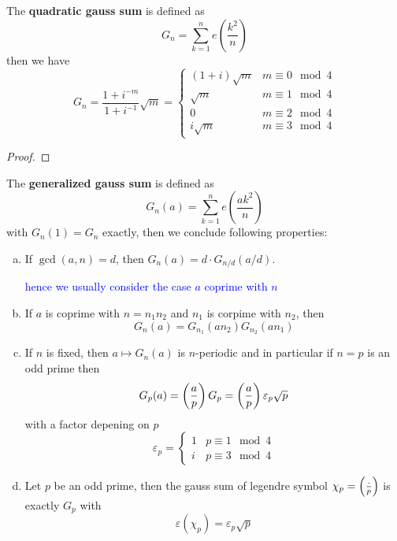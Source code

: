 \begin{lemma}
    The \textbf{ quadratic gauss sum} is defined as 
    \[G_n = \sum_{k=1}^n e(\frac{k^2}{n})\]
    then we have
    \[G_n = \frac{1+i^{-m}}{1+i^{-1}}\sqrt{m} = \begin{cases}
        (1+i)\sqrt{m} & m \equiv 0 \mod 4 \\
        \sqrt{m} & m \equiv 1 \mod 4 \\
        0 & m \equiv 2 \mod 4 \\
        i\sqrt{m} & m \equiv 3 \mod 4
    \end{cases}\]
\end{lemma}

\begin{proof}
    
\end{proof}

\begin{lemma}
    The \textbf{generalized gauss sum} is defined as 
    \[G_n(a) = \sum_{k=1}^n e(\frac{ak^2}{n})\]
    with \(G_n(1) = G_n\) exactly, then we conclude following properties:
    \begin{enumerate}[(a)]
        \item If \(\gcd(a,n) = d\), then \(G_n(a) = d \cdot G_{n/d}(a/d)\).
        \begin{center}
            \textcolor{blue}{hence we usually consider the case \(a\) coprime with \(n\)}
        \end{center}

        \item If \(a\) is coprime with \(n = n_1n_2\) and \(n_1\) is corpime with \(n_2\), then 
        \[G_n(a) = G_{n_1}(an_2) G_{n_2}(an_1)\] 

        \item If \(n\) is fixed, then \(a \mapsto G_n(a)\) is \(n\)-periodic and in particular if \(n = p\) is an odd prime then
        \[G_p(a) = \left(\frac{a}{p}\right) G_p = \left(\frac{a}{p}\right) \varepsilon_p \sqrt{p}\]
        with a factor depening on \(p\)
        \[\varepsilon_p = \begin{cases}
            1 & p \equiv 1 \mod 4 \\
            i & p \equiv 3 \mod 4
        \end{cases}\]

        \item Let \(p\) be an odd prime, then the gauss sum of legendre symbol \(\chi_p = \left(\frac{\cdot}{p}\right)\) is exactly \(G_p\) with
        \[\varepsilon(\chi_p) = \varepsilon_p \sqrt{p}\]
    \end{enumerate}
\end{lemma}

